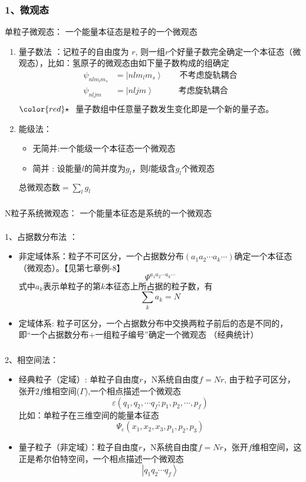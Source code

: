 \begin{frame}
  \frametitle{ 1、微观态}
  \alert{单粒子微观态：} 一个能量本征态是粒子的一个微观态
  \begin{enumerate}
    \item 量子数法 ：记粒子的自由度为 $r$, 则一组$r$个好量子数完全确定一个本征态（微观态），比如：氢原子的微观态由如下量子数构成的组确定
    \[
      \begin{aligned}
        \psi _{nlm_lm_s} &= \left\vert nlm_lm_s \right\rangle \qquad \text{不考虑旋轨耦合} \\ 
        \psi _{nljm} &= \left\vert nljm \right\rangle \qquad \quad \text{考虑旋轨耦合} \\ 
      \end{aligned}\]
      ${\color{red}\star}~$ 量子数组中任意量子数发生变化即是一个新的量子态。
    \item 能级法：
     \begin{itemize}
      \item 无简并:一个能级一个本征态一个微观态
      \item 简并 : 设能量$l$的简并度为$g_l$，则$l$能级含$g_l$个微观态 \\
     \end{itemize}
     $\text{总微观态数} = \sum_l g_l $ 
  \end{enumerate}
\end{frame} 

\begin{frame}
  \frametitle{}
  \alert{N粒子系统微观态：} 一个能量本征态是系统的一个微观态 \\
  ~~\\
  1、占据数分布法 ：
    \begin{itemize}
      \item 非定域体系：粒子不可区分，一个占据数分布$(a_1 a_2 \cdots a_k \cdots)$确定一个本征态（微观态）。【见第七章例-8】
      \[ \Psi ^{a_1 a_2 \cdots a_k \cdots}\]
      式中$a_k$表示单粒子的第$k$本征态上所占据的粒子数，有
      \[\sum_k a_k = N \]
      \item 定域体系: 粒子可区分，一个占据数分布中交换两粒子前后的态是不同的，即“一个占据数分布+一组粒子编号”确定一个微观态 （经典统计）
     \end{itemize}
\end{frame} 

\begin{frame}[label=current]
  \frametitle{}
  2、相空间法： 
  \begin{itemize}
   \item 经典粒子（定域）: 单粒子自由度$r$，N系统自由度$f=Nr$, 由于粒子可区分，张开$2f$维相空间($\Gamma$),一个相点描述一个微观态
   \[\varepsilon(q_1,q_2,\cdots q_f; p_1, p_2, \cdots ,p_f)\]
   比如：单粒子在三维空间的能量本征态
   \[ \Psi _\varepsilon (x_1, x_2, x_3, p_1,p_2,p_3)\]
   \item 量子粒子（非定域）：粒子自由度$r$，N系统自由度$f=Nr$，张开$f$维相空间，这正是希尔伯特空间，一个相点描述一个微观态
   \[ \left\vert q_1q_2\cdots q_f\right\rangle \]
  \end{itemize}
\end{frame} 

